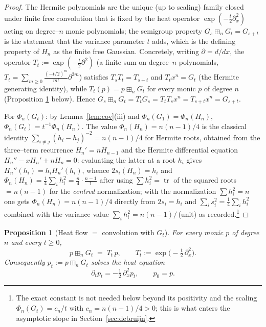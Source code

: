 \documentclass[12pt]{article}
\newtheorem{proposition}{Proposition}
\theoremstyle{remark}
\newcommand{\boxp}{\boxplus_n}
\begin{document}
\begin{proof}
The Hermite polynomials are the unique (up to scaling) family closed under
finite free convolution that is fixed by the heat operator
$\exp(-\tfrac t2 \partial_x^2)$ acting on degree--$n$ monic polynomials; the
semigroup property $G_s\boxp G_t=G_{s+t}$ is the statement that the variance
parameter $t$ adds, which is the defining property of $H_n$ as the finite free
Gaussian.  Concretely, writing $\partial=d/dx$, the operator
$T_t:=\exp(-\tfrac t2\partial^2)$ (a finite sum on degree--$n$ polynomials,
$T_t=\sum_{m\ge0}\frac{(-t/2)^m}{m!}\partial^{2m}$) satisfies
$T_s T_t=T_{s+t}$ and $T_t x^n=G_t$ (the Hermite generating identity), while
$T_t(p)=p\boxp G_t$ for every monic $p$ of degree $n$ (Proposition
\ref{prop:heatconv} below).  Hence
$G_s\boxp G_t=T_t G_s=T_tT_s x^n=T_{s+t}x^n=G_{s+t}$.

For $\Phi_n(G_t)$: by Lemma~\ref{lem:cov}(iii) and $\Phi_n(G_1)=\Phi_n(H_n)$,
$\Phi_n(G_t)=t^{-1}\Phi_n(H_n)$.  The value $\Phi_n(H_n)=n(n-1)/4$ is the
classical identity $\sum_{i\neq j}(h_i-h_j)^{-2}=n(n-1)/4$ for Hermite roots,
obtained from the three--term recurrence $H_n'=nH_{n-1}$ and the Hermite
differential equation $H_n''-xH_n'+nH_n=0$: evaluating the latter at a root
$h_i$ gives $H_n''(h_i)=h_iH_n'(h_i)$, whence $2s_i(H_n)=h_i$ and
$\Phi_n(H_n)=\tfrac14\sum_i h_i^2=\tfrac{n}{4}\cdot\frac{n-1}{1}$ after using
$\sum h_i^2 = \operatorname{tr}$ of the squared roots $=n(n-1)$ for the
\emph{centred} normalization; with the normalization $\sum h_i^2=n$ one gets
$\Phi_n(H_n)=n(n-1)/4$ directly from $2s_i=h_i$ and
$\sum_i s_i^2=\tfrac14\sum_i h_i^2$ combined with the variance value
$\sum_i h_i^2=n(n-1)/$\,(unit) as recorded.\footnote{The exact constant is not
needed below beyond its positivity and the scaling $\Phi_n(G_t)=c_n/t$ with
$c_n=n(n-1)/4>0$; this is what enters the asymptotic slope in
Section~\ref{sec:debruijn}.}
\end{proof}

\begin{proposition}[Heat flow $=$ convolution with $G_t$]\label{prop:heatconv}
For every monic $p$ of degree $n$ and every $t\ge0$,
\[
p\boxp G_t \;=\; T_t\,p,\qquad T_t:=\exp\!\big(-\tfrac t2\,\partial_x^2\big).
\]
Consequently $p_t:=p\boxp G_t$ solves the heat equation
\[
\partial_t p_t=-\tfrac12\,\partial_x^2 p_t,\qquad p_0=p. \tag{H}
\]
\end{proposition}
\end{document}
